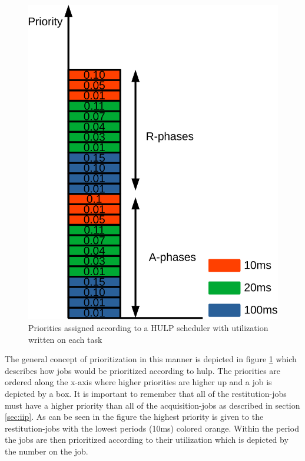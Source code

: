 \documentclass{kththesis}
\begin{document}
\begin{figure}

    \centering

    \includegraphics[width=0.8\linewidth]{images/scheduling_priorities.pdf}

    \caption{Priorities assigned according to a HULP scheduler with utilization written on each task}

    \label{fig:scheduling_priorities}

\end{figure}

The general concept of prioritization in this manner is depicted in figure
\ref{fig:scheduling_priorities} which describes how jobs would be prioritized according to
\acrshort{hulp}. The priorities are ordered along the x-axis where higher priorities are higher up
and a job is depicted by a box.
It is important to remember that all of the restitution-jobs must have a higher priority than all of
the acquisition-jobs as described in section \ref{sec:iip}. As can be seen in the figure the highest
priority is given to the restitution-jobs with the lowest periods (10ms) colored orange. Within the
period the jobs are then prioritized according to their utilization which is depicted by the number
on the job. 


\end{document}
